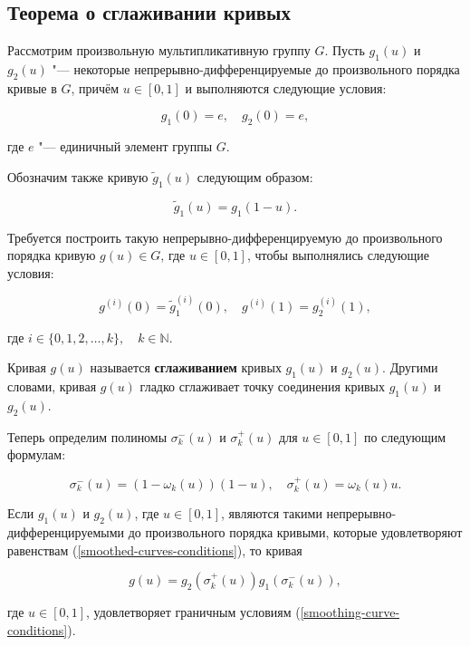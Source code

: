 \subsection*{Теорема о сглаживании кривых}

Рассмотрим произвольную мультипликативную группу $G$. Пусть $g_1(u)$ и $g_2(u)$ "--- некоторые
непрерывно-дифференцируемые до произвольного порядка кривые в $G$, причём $u \in [0,1]$ и выполняются следующие условия:

\begin{equation}
g_1(0)=e, \quad g_2(0)=e,
\label{smoothed-curves-conditions}
\end{equation}

\noindent где $e$ "--- единичный элемент группы $G$.

Обозначим также кривую $\tilde g_1(u)$ следующим образом:

$$
\tilde g_1(u)=g_1(1-u).
$$

Требуется построить такую непрерывно-дифференцируемую до произвольного порядка кривую $g(u)\in G$, где $u \in [0,1]$,
чтобы выполнялись следующие условия:

\begin{equation}
g^{(i)}(0)=\tilde g_1^{(i)}(0), \quad g^{(i)}(1)=g_2^{(i)}(1),
\label{smoothing-curve-conditions}
\end{equation}

\noindent где $i \in \{0,1,2,\dots,k\},\quad k\in\mathbb{N}$.

\begin{definition}
Кривая $g(u)$ называется \textbf{сглаживанием} кривых $g_1(u)$ и $g_2(u)$. Другими словами, кривая $g(u)$ гладко
сглаживает точку соединения кривых $g_1(u)$ и $g_2(u)$.
\end{definition}

Теперь определим полиномы $\sigma_k^-(u)$ и $\sigma_k^+(u)$ для $u \in [0,1]$ по следующим формулам:

$$
\sigma_k^-(u)=(1-\omega_k(u))(1-u), \quad \sigma_k^+(u)=\omega_k(u)u.
$$

\begin{theorem}
Если $g_1(u)$ и $g_2(u)$, где $u \in [0,1]$, являются такими непрерывно-дифференцируемыми до произвольного порядка
кривыми, которые удовлетворяют равенствам (\ref{smoothed-curves-conditions}), то кривая

$$
g(u)=g_2(\sigma_k^+(u))g_1(\sigma_k^-(u)),
$$

\noindent где $u \in [0,1]$, удовлетворяет граничным условиям (\ref{smoothing-curve-conditions}).
\end{theorem}
